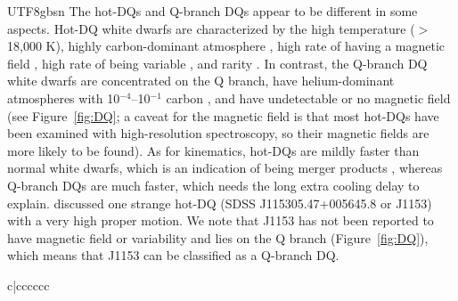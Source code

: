 \documentclass[twocolumn, times, trackchanges]{aastex63_bren}
\begin{document}
\begin{CJK*}{UTF8}{gbsn}
The hot-DQs and Q-branch DQs appear to be different in some aspects. Hot-DQ white dwarfs are characterized by the high temperature ($>$18,000 K), highly carbon-dominant atmosphere \citep{Williams_2013}, high rate of having a magnetic field \citep{Dufour_2010, Dufour_2013}, high rate of being variable \citep[e.g.,][]{Dufour_2009, Dunlap_2010, Dufour_2011, Williams_2016}, and rarity \citep[e.g.,][]{Dufour_2008}. In contrast, the Q-branch DQ white dwarfs are concentrated on the Q branch, have helium-dominant atmospheres with 10$^{-4}$--10$^{-1}$ carbon \citep{Kepler_2015, Kepler_2016, Coutu_2019}, and have undetectable or no magnetic field (see Figure~\ref{fig:DQ}; a caveat for the magnetic field is that most hot-DQs have been examined with high-resolution spectroscopy, so their magnetic fields are more likely to be found). As for kinematics, hot-DQs are mildly faster than normal white dwarfs, which is an indication of being merger products \citep{Dunlap_2015}, whereas Q-branch DQs are much faster, which needs the long extra cooling delay to explain. \citet{Dunlap_2015} discussed one strange hot-DQ (SDSS J115305.47+005645.8 or J1153) with a very high proper motion. We note that J1153 has not been reported to have magnetic field or variability and lies on the Q branch (Figure~\ref{fig:DQ}), which means that J1153 can be classified as a Q-branch DQ. 

\begin{deluxetable}{c|cccccc}
\enddata
{}
\end{deluxetable}


\end{CJK*}
\end{document}
